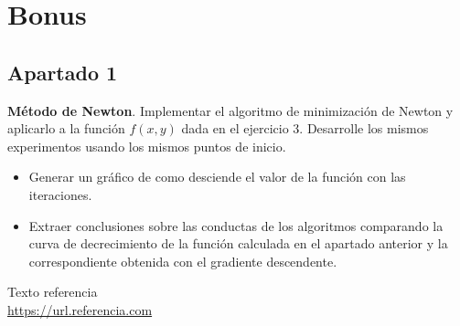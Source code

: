 \documentclass[11pt,a4paper]{article}
\begin{document}
\section{Bonus}

\subsection*{Apartado 1}
\noindent \textbf{Método de Newton}. Implementar el algoritmo de minimización de Newton y aplicarlo a la función $f(x, y)$
dada en el ejercicio 3. Desarrolle los mismos experimentos usando los mismos puntos de inicio.

\begin{itemize}
	\item Generar un gráfico de como desciende el valor de la función con las iteraciones.
	\item Extraer conclusiones sobre las conductas de los algoritmos comparando la curva de decrecimiento de la función
	calculada en el apartado anterior y la correspondiente obtenida con el gradiente descendente.
\end{itemize}

\newpage

\begin{thebibliography}{5}

Texto referencia
\\\url{https://url.referencia.com}

\end{thebibliography}
\end{document}
